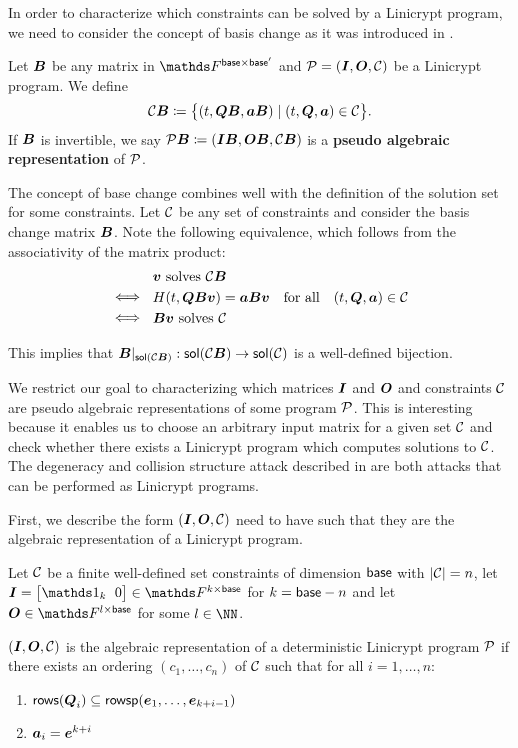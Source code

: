 In order to characterize which constraints can be solved by a Linicrypt program,
we need to consider the concept of basis change as it was introduced in \cite{C:CarRos16}.

\begin{defn}
    Let $\v B$ be any matrix in $\F^{\base \times \base'}$
    and $\P = (\Inp, \O, \C)$ be a Linicrypt program.
    We define 
    \[
        \C \B \coloneqq \big\{ (t, \Q \B, \va \B) \mid (t, \Q, \va) \in \C \big\}.
    \]
    If $\B$ is invertible,
    we say $\P\B \coloneqq (\Inp \B, \O \B, \C \B)$ is a \textbf{pseudo algebraic representation} of $\P$.
\end{defn}

The concept of base change combines well with the definition of the solution set for some constraints.
Let $\C$ be any set of constraints and consider the basis change matrix $\B$.
Note the following equivalence, which follows from the associativity of the matrix product:
\begin{align*}
&\parbox{30pt}{\phantom{$\iff$}} \vv \textrm{ solves } \C\B \\
&\parbox{30pt}{$\iff$} \H(t, \Q \B \vv) = \va \B \vv \quad \textrm{for all} \quad (t, \Q, \va) \in \C \\
&\parbox{30pt}{$\iff$} \B \vv \textrm{ solves } \C
\end{align*}

This implies that $\B|_{\sol(\C\B)}: \sol(\C\B) \to \sol(\C)$ is a well-defined bijection.

We restrict our goal to characterizing which matrices $\I$ and $\O$ and constraints $\C$ are pseudo algebraic representations of some program $\P$. 
This is interesting because it enables us to choose an arbitrary input matrix for a given set $\C$ and check whether there exists a Linicrypt program which computes solutions to $\C$.
The degeneracy and collision structure attack described in \cite{TCC:McQSwoRos19} are both attacks that can be performed as Linicrypt programs.

First, we describe the form $(\I, \O, \C)$ need to have such that they are the algebraic representation of a Linicrypt program.
\begin{lemma}
\label{is_algebraic_repr}
    Let $\C$ be a finite well-defined set constraints of dimension $\base$ with $|\C| = n$,
    let $\I = \m{\Id_k & 0} \in \F^{k\times\base}$ for $k = \base - n$
    and let $\O \in \F^{l \times \base}$ for some $l \in \NN$.
       
    $(\I, \O, \C)$ is the algebraic representation of a deterministic Linicrypt program $\P$
    if there exists an ordering $(c_1, \dots, c_n)$ of $\C$
    such that for all $i=1, \dots, n$:
    \begin{enumerate}
    \item
    $\rows(\Q_i) \subseteq \rowsp(\dts \ve {k+i-1})$
    \item
    $\va_i = \ve^{k+i}$
    \end{enumerate}
\end{lemma}

